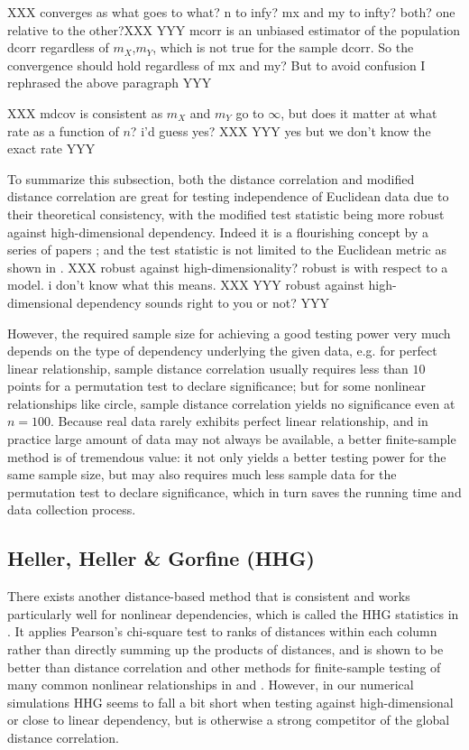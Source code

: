 \documentclass[11pt]{article}
\begin{document}
XXX converges as what goes to what? n to infy? mx and my to infty? both? one relative to the other?XXX
YYY mcorr is an unbiased estimator of the population dcorr regardless of $m_{X}$,$m_{Y}$, which is not true for the sample dcorr. So the convergence should hold regardless of mx and my? But to avoid confusion I rephrased the above paragraph YYY

XXX mdcov is consistent as $m_X$ and $m_Y$ go to $\infty$, but does it matter at what rate as a function of $n$? i'd guess yes? XXX
YYY yes but we don't know the exact rate YYY

To summarize this subsection, both the distance correlation and modified distance correlation are great for testing independence of Euclidean data due to their theoretical consistency, with the modified test statistic being more robust against high-dimensional dependency. Indeed it is a flourishing concept by a series of papers \cite{BakirovRizzoSzekely2006, SzekelyRizzoBakirov2007, SzekelyRizzo2009, BickelXu2009, Kosorok2009, Remillard2009, LiZhongZhu2012, SzekelyRizzo2013a, SzekelyRizzo2013b, SzekelyRizzo2014}; and the test statistic is not limited to the Euclidean metric as shown in \cite{Lyons2013}. 
XXX robust against high-dimensionality? robust is with respect to a model. i don't know what this means. XXX
YYY robust against high-dimensional dependency sounds right to you or not? YYY

However, the required sample size for achieving a good testing power very much depends on the type of dependency underlying the given data, e.g. for perfect linear relationship, sample distance correlation usually requires less than $10$ points for a permutation test to declare significance; but for some nonlinear relationships like circle, sample distance correlation yields no significance even at $n=100$. Because real data rarely exhibits perfect linear relationship, and in practice large amount of data may not always be available, a better finite-sample method is of tremendous value: it not only yields a better testing power for the same sample size, but may also requires much less sample data for the permutation test to declare significance, which in turn saves the running time and data collection process. 


\subsection{Heller, Heller \& Gorfine (HHG)}
\label{sec:hhg}


There exists another distance-based method that is consistent and works particularly well for nonlinear dependencies, which is called the HHG statistics in \cite{HellerGorfine2013}. It applies Pearson's chi-square test to ranks of distances within each column rather than directly summing up the products of distances, and is shown to be better than distance correlation and other methods for finite-sample testing of many common nonlinear relationships in \cite{GorfineHellerHeller2012} and \cite{HellerGorfine2013}. However, in our numerical simulations HHG seems to fall a bit short when testing against high-dimensional or close to linear dependency, but is otherwise a strong competitor of the global distance correlation. 
\end{document}
